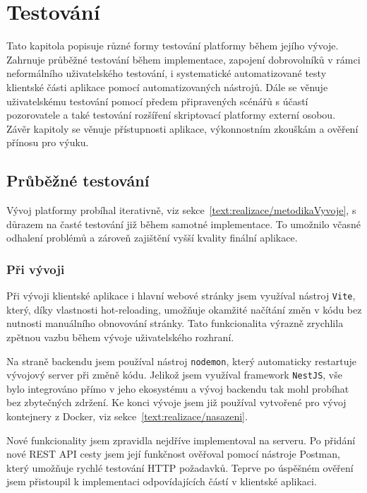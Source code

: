 \chapter{Testování}\label{text:testovani}

\begin{chapterabstract}
Tato kapitola popisuje různé formy testování platformy během jejího vývoje. 
Zahrnuje průběžné testování během implementace, zapojení dobrovolníků v rámci neformálního uživatelského testování, i systematické automatizované testy klientské části aplikace pomocí automatizovaných nástrojů. 
Dále se věnuje uživatelskému testování pomocí předem připravených scénářů s účastí pozorovatele a také testování rozšíření skriptovací platformy externí osobou. 
Závěr kapitoly se věnuje přístupnosti aplikace, výkonnostním zkouškám a ověření přínosu pro výuku.
\end{chapterabstract}

\section{Průběžné testování}\label{text:testovani/prubezne}

Vývoj platformy probíhal iterativně, viz sekce~\ref{text:realizace/metodikaVyvoje}, s důrazem na časté testování již během samotné implementace.
To umožnilo včasné odhalení problémů a zároveň zajištění vyšší kvality finální aplikace.

\subsection{Při vývoji}

Při vývoji klientské aplikace i hlavní webové stránky jsem využíval nástroj \texttt{Vite}, který, díky vlastnosti hot-reloading, umožňuje okamžité načítání změn v kódu bez nutnosti manuálního obnovování stránky.
Tato funkcionalita výrazně zrychlila zpětnou vazbu během vývoje uživatelského rozhraní.

Na straně backendu jsem používal nástroj \texttt{nodemon}, který automaticky restartuje vývojový server při změně kódu. 
Jelikož jsem využíval framework \texttt{NestJS}, vše bylo integrováno přímo v jeho ekosystému a vývoj backendu tak mohl probíhat bez zbytečných zdržení.
Ke konci vývoje jsem již používal vytvořené pro vývoj kontejnery z Docker, viz sekce~\ref{text:realizace/nasazeni}.

Nové funkcionality jsem zpravidla nejdříve implementoval na serveru.
Po přidání nové REST API cesty jsem její funkčnost ověřoval pomocí nástroje Postman, který umožňuje rychlé testování HTTP požadavků.
Teprve po úspěšném ověření jsem přistoupil k implementaci odpovídajících částí v klientské aplikaci.


